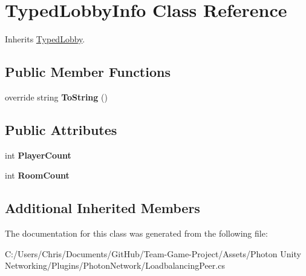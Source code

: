 \hypertarget{class_typed_lobby_info}{}\section{Typed\+Lobby\+Info Class Reference}
\label{class_typed_lobby_info}


Inherits \hyperlink{class_typed_lobby}{Typed\+Lobby}.

\subsection*{Public Member Functions}
\begin{DoxyCompactItemize}
\item 
override string {\bfseries To\+String} ()\hypertarget{class_typed_lobby_info_afc589242ac6c9946eb6b5cea6fcf9d81}{}\label{class_typed_lobby_info_afc589242ac6c9946eb6b5cea6fcf9d81}

\end{DoxyCompactItemize}
\subsection*{Public Attributes}
\begin{DoxyCompactItemize}
\item 
int {\bfseries Player\+Count}\hypertarget{class_typed_lobby_info_a5b7b6fb52a3b9813e8b2af49459c6475}{}\label{class_typed_lobby_info_a5b7b6fb52a3b9813e8b2af49459c6475}

\item 
int {\bfseries Room\+Count}\hypertarget{class_typed_lobby_info_a948789896eb6815a2628681f338d754b}{}\label{class_typed_lobby_info_a948789896eb6815a2628681f338d754b}

\end{DoxyCompactItemize}
\subsection*{Additional Inherited Members}


The documentation for this class was generated from the following file\+:\begin{DoxyCompactItemize}
\item 
C\+:/\+Users/\+Chris/\+Documents/\+Git\+Hub/\+Team-\/\+Game-\/\+Project/\+Assets/\+Photon Unity Networking/\+Plugins/\+Photon\+Network/Loadbalancing\+Peer.\+cs\end{DoxyCompactItemize}
